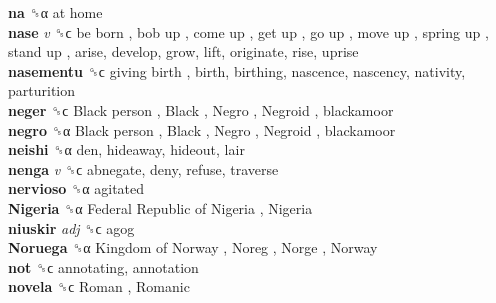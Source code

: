 \textbf{na} ␝α   at home   \\
\textbf{nase} \emph{v}  ␝ϲ   be born ,  bob up ,  come up ,  get up ,  go up ,  move up ,  spring up ,  stand up , arise, develop, grow, lift, originate, rise, uprise  \\
\textbf{nasementu} ␝ϲ   giving birth , birth, birthing, nascence, nascency, nativity, parturition  \\
\textbf{neger} ␝ϲ   Black person ,  Black ,  Negro ,  Negroid , blackamoor  \\
\textbf{negro} ␝α   Black person ,  Black ,  Negro ,  Negroid , blackamoor  \\
\textbf{neishi} ␝α  den, hideaway, hideout, lair  \\
\textbf{nenga} \emph{v}  ␝ϲ  abnegate, deny, refuse, traverse  \\
\textbf{nervioso} ␝α  agitated  \\
\textbf{Nigeria} ␝α   Federal Republic of Nigeria ,  Nigeria   \\
\textbf{niuskir} \emph{adj}  ␝ϲ  agog  \\
\textbf{Noruega} ␝α   Kingdom of Norway ,  Noreg ,  Norge ,  Norway   \\
\textbf{not} ␝ϲ  annotating, annotation  \\
\textbf{novela} ␝ϲ   Roman ,  Romanic   \\
